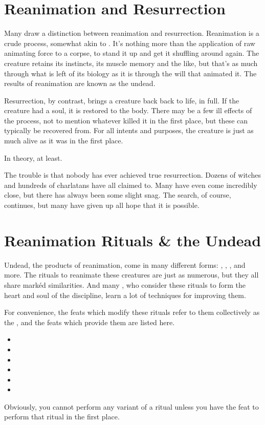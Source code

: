 
\section{Reanimation and Resurrection}

Many  draw a distinction between reanimation and resurrection.
Reanimation is a crude process, somewhat akin to .
It's nothing more than the application of raw animating force to a corpse, to stand it up and get it shuffling around again.
The creature retains its instincts, its muscle memory and the like, but that's as much through what is left of its biology as it is through the will that animated it.
The results of reanimation are known as the undead.

Resurrection, by contrast, brings a creature back back to life, in full.
If the creature had a soul, it is restored to the body.
There may be a few ill effects of the process, not to mention whatever killed it in the first place, but these can typically be recovered from.
For all intents and purposes, the creature is just as much alive as it was in the first place.

In theory, at least.

The trouble is that nobody has ever achieved true resurrection.
Dozens of witches and hundreds of charlatans have all claimed to.
Many have even come incredibly close, but there has always been some slight snag.
The search, of course, continues, but many have given up all hope that it is possible.

\section{Reanimation Rituals \& the Undead}

Undead, the products of reanimation, come in many different forms: , , , and more.
The rituals to reanimate these creatures are just as numerous, but they all share mark{\'e}d similarities.
And many , who consider these rituals to form the heart and soul of the discipline, learn a lot of techniques for improving them.

For convenience, the feats which modify these rituals refer to them collectively as the {\reanimationrituals}, and the feats which provide them are listed here.
\begin{itemize}
	\item {}
	\item {}
	\item {}
	\item {}
	\item {}
	\item {}
\end{itemize}
Obviously, you cannot perform any variant of a ritual unless you have the feat to perform that ritual in the first place.

